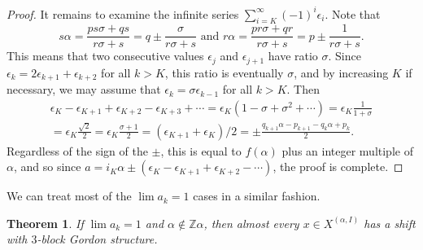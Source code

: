 \documentclass[11pt,reqno]{amsart}
\newtheorem{theorem}{Theorem}[section]
\theoremstyle{definition}
\theoremstyle{plain}
\begin{document}
\begin{proof}
It remains to examine the infinite series $\sum_{i=K}^{\infty} (-1)^i \epsilon_i$.
Note that 
\[
s\alpha = \frac{ps\sigma + qs}{r \sigma + s} = q \pm \frac{\sigma}{r\sigma + s} \textrm { and }
r\alpha = \frac{pr\sigma + qr}{r \sigma + s} = p \pm \frac{1}{r \sigma + s}.
\]
This means that two consecutive values $\epsilon_j$ and $\epsilon_{j+1}$ have ratio $\sigma$. Since 
$\epsilon_k = 2 \epsilon_{k+1} + \epsilon_{k+2}$ for all $k > K$, this ratio is eventually $\sigma$, and by increasing $K$ if necessary, we may assume that
$\epsilon_{k} = \sigma \epsilon_{k-1}$ for all $k > K$. Then
\begin{multline*}
\epsilon_K - \epsilon_{K+1} + \epsilon_{K+2} - \epsilon_{K+3} + \cdots
= \epsilon_{K} (1 - \sigma + \sigma^2 + \cdots)
= \epsilon_{K} \frac{1}{1 + \sigma}\\
= \epsilon_{K} \frac{\sqrt{2}}{2} = \epsilon_K \frac{\sigma + 1}{2} = (\epsilon_{K+1} + \epsilon_{K})/2 = \pm \frac{q_{k+1}\alpha - p_{k+1} - q_k \alpha + p_k}{2}.
\end{multline*}
Regardless of the sign of the $\pm$, this is equal to $f(\alpha)$ plus an integer multiple of $\alpha$, and so 
since $a = i_K \alpha \pm (\epsilon_K - \epsilon_{K+1} + \epsilon_{K+2} - \cdots)$, the proof is complete.

\end{proof}

We can treat most of the $\lim a_k = 1$ cases in a similar fashion.

\begin{theorem}\label{case4}
If $\lim a_k = 1$ and $\alpha \notin \mathbb{Z}\alpha$, then almost every $x \in X^{(\alpha, I)}$ has a shift with $3$-block Gordon structure.
\end{theorem}
\end{document}

